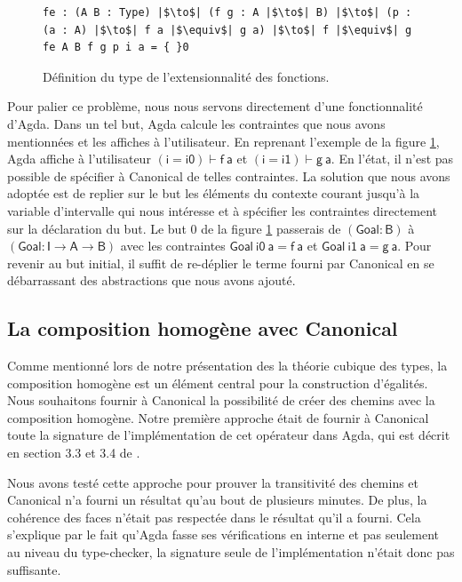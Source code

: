 \documentclass[11pt]{article}
\begin{document}
\begin{figure}[h]
\centering
\begin{verbatim}
fe : (A B : Type) |$\to$| (f g : A |$\to$| B) |$\to$| (p : (a : A) |$\to$| f a |$\equiv$| g a) |$\to$| f |$\equiv$| g
fe A B f g p i a = { }0
\end{verbatim}
\caption{Définition du type de l'extensionnalité des fonctions. }
\label{fig:agda-fe}
\end{figure}

Pour palier ce problème, nous nous servons directement d'une fonctionnalité d'Agda.
Dans un tel but, Agda calcule les contraintes que nous avons mentionnées et les affiches à l'utilisateur.
En reprenant l'exemple de la figure \ref{fig:agda-fe}, Agda affiche à l'utilisateur $\mathsf{(i = i0) \vdash f~a}$ et $\mathsf{(i = i1) \vdash g~a}$.
En l'état, il n'est pas possible de spécifier à Canonical de telles contraintes.
La solution que nous avons adoptée est de replier sur le but les éléments du contexte courant jusqu'à la variable d'intervalle qui nous intéresse et à spécifier les contraintes directement sur la déclaration du but.
Le but 0 de la figure \ref{fig:agda-fe} passerais de $\mathsf{(Goal : B)}$ à $\mathsf{(Goal : I \to A \to B)}$ avec les contraintes $\mathsf{Goal~i0~a = f~a}$ et $\mathsf{Goal~i1~a = g~a}$.
Pour revenir au but initial, il suffit de re-déplier le terme fourni par Canonical en se débarrassant des abstractions que nous avons ajouté.


\subsection{La composition homogène avec Canonical}
Comme mentionné lors de notre présentation des la théorie cubique des types, la composition homogène est un élément central pour la construction d'égalités. 
Nous souhaitons fournir à Canonical la possibilité de créer des chemins avec la composition homogène.
Notre première approche était de fournir à Canonical toute la signature de l'implémentation de cet opérateur dans Agda, 
qui est décrit en section 3.3 et 3.4 de \cite{vezzosi2019cubical}.

Nous avons testé cette approche pour prouver la transitivité des chemins et Canonical n'a fourni un résultat qu'au bout de plusieurs minutes.
De plus, la cohérence des faces n'était pas respectée dans le résultat qu'il a fourni.
Cela s'explique par le fait qu'Agda fasse ses vérifications en interne et pas seulement au niveau du type-checker,
la signature seule de l'implémentation n'était donc pas suffisante.
\end{document}
